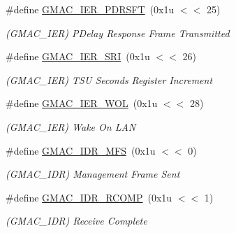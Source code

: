 \begin{DoxyCompactItemize}
\mbox{\label{group__SAME70__GMAC_gad38d19aacd63d6e648838551070e6f68}} 
\#define \mbox{\hyperlink{group__SAME70__GMAC_gad38d19aacd63d6e648838551070e6f68}{G\+M\+A\+C\+\_\+\+I\+E\+R\+\_\+\+P\+D\+R\+S\+FT}}~(0x1u $<$$<$ 25)
\begin{DoxyCompactList}\small\item\em (G\+M\+A\+C\+\_\+\+I\+ER) P\+Delay Response Frame Transmitted \end{DoxyCompactList}\item 
\mbox{\label{group__SAME70__GMAC_ga7ef1f7c2933d88177c8266f8c5621041}} 
\#define \mbox{\hyperlink{group__SAME70__GMAC_ga7ef1f7c2933d88177c8266f8c5621041}{G\+M\+A\+C\+\_\+\+I\+E\+R\+\_\+\+S\+RI}}~(0x1u $<$$<$ 26)
\begin{DoxyCompactList}\small\item\em (G\+M\+A\+C\+\_\+\+I\+ER) T\+SU Seconds Register Increment \end{DoxyCompactList}\item 
\mbox{\label{group__SAME70__GMAC_gabc95f3b49e589e5ec2f67d507477f641}} 
\#define \mbox{\hyperlink{group__SAME70__GMAC_gabc95f3b49e589e5ec2f67d507477f641}{G\+M\+A\+C\+\_\+\+I\+E\+R\+\_\+\+W\+OL}}~(0x1u $<$$<$ 28)
\begin{DoxyCompactList}\small\item\em (G\+M\+A\+C\+\_\+\+I\+ER) Wake On L\+AN \end{DoxyCompactList}\item 
\mbox{\label{group__SAME70__GMAC_ga566f3409739031ca1621601dac156426}} 
\#define \mbox{\hyperlink{group__SAME70__GMAC_ga566f3409739031ca1621601dac156426}{G\+M\+A\+C\+\_\+\+I\+D\+R\+\_\+\+M\+FS}}~(0x1u $<$$<$ 0)
\begin{DoxyCompactList}\small\item\em (G\+M\+A\+C\+\_\+\+I\+DR) Management Frame Sent \end{DoxyCompactList}\item 
\mbox{\label{group__SAME70__GMAC_gadeb1d56444c642e1d190b22a575fb13f}} 
\#define \mbox{\hyperlink{group__SAME70__GMAC_gadeb1d56444c642e1d190b22a575fb13f}{G\+M\+A\+C\+\_\+\+I\+D\+R\+\_\+\+R\+C\+O\+MP}}~(0x1u $<$$<$ 1)
\begin{DoxyCompactList}\small\item\em (G\+M\+A\+C\+\_\+\+I\+DR) Receive Complete \end{DoxyCompactList}\item 
$$
\end{DoxyCompactItemize}
